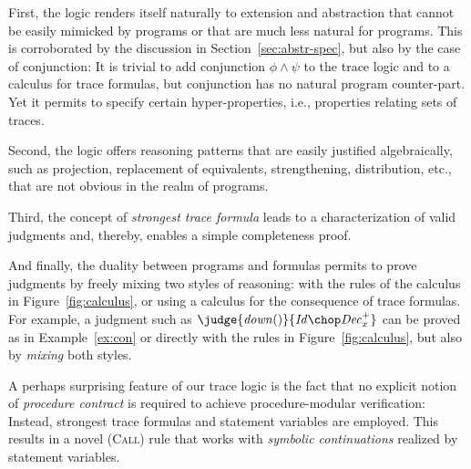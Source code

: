 \documentclass[a4paper,numberwithinsect]{lipics-v2021}
\begin{document}
First, the logic renders itself naturally to extension and abstraction
that cannot be easily mimicked by programs or that are much less
natural for programs.
%
This is corroborated by the discussion in
Section~\ref{sec:abstr-spec}, but also by the case of conjunction: It
is trivial to add conjunction $\phi\land\psi$ to the trace logic and
to a calculus for trace formulas, but conjunction has no natural
program counter-part. Yet it permits to specify certain
hyper-properties, i.e., properties relating sets of traces.

Second, the logic offers reasoning patterns that are easily justified
algebraically, such as projection, replacement of equivalents,
strengthening, distribution, etc., that are not obvious in the realm
of programs.

Third, the concept of \emph{strongest trace formula} leads to a
characterization of valid judgments and, thereby, enables a simple
completeness proof.

And finally, the duality between programs and formulas permits to
prove judgments by freely mixing two styles of reasoning: with the
rules of the calculus in Figure~\ref{fig:calculus}, or using a calculus
for the consequence of trace formulas.
%
For example, a judgment such as
$\judge{\mathit{down()}}{\mathit{Id}\chop\mathit{Dec}_x^+}$ can be
proved as in Example~\ref{ex:con} or directly with the rules in
Figure~\ref{fig:calculus}, but also by \emph{mixing} both styles.

A perhaps surprising feature of our trace logic is the fact that no
explicit notion of \emph{procedure contract} is required to achieve
procedure-modular verification: Instead, strongest trace formulas and
statement variables are employed.
%
This results in a novel (\textsc{Call}) rule that works with
\emph{symbolic continuations} realized by statement variables.






\end{document}
